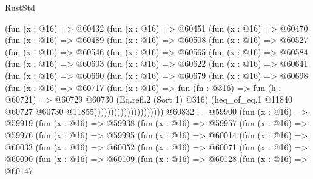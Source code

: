 \begin{lexlean}{RustStd}
\begin{coremodule}
          (fun (x : @16) =>
          @60432
            (fun (x : @16) =>
            @60451
              (fun (x : @16) =>
              @60470
                (fun (x : @16) =>
                @60489
                  (fun (x : @16) =>
                  @60508
                    (fun (x : @16) =>
                    @60527
                      (fun (x : @16) =>
                      @60546
                        (fun (x : @16) =>
                        @60565
                          (fun (x : @16) =>
                          @60584
                            (fun (x : @16) =>
                            @60603
                              (fun (x : @16) =>
                              @60622
                                (fun (x : @16) =>
                                @60641
                                  (fun (x : @16) =>
                                  @60660
                                    (fun (x : @16) =>
                                    @60679
                                      (fun (x : @16) =>
                                      @60698
                                        (fun (x : @16) =>
                                        @60717
                                          (fun (x : @16) =>
                                          fun (fn : @316) =>
                                          fun (h : @60721) =>
                                          @60729
                                            @60730
                                            (Eq.refl.{2} (Sort 1) @316)
                                            (heq_of_eq.{1}
                                              @11840
                                              @60727
                                              @60730
                                              @11855)))))))))))))))))))))
@60832 := @59900
    (fun (x : @16) =>
    @59919
      (fun (x : @16) =>
      @59938
        (fun (x : @16) =>
        @59957
          (fun (x : @16) =>
          @59976
            (fun (x : @16) =>
            @59995
              (fun (x : @16) =>
              @60014
                (fun (x : @16) =>
                @60033
                  (fun (x : @16) =>
                  @60052
                    (fun (x : @16) =>
                    @60071
                      (fun (x : @16) =>
                      @60090
                        (fun (x : @16) =>
                        @60109
                          (fun (x : @16) =>
                          @60128
                            (fun (x : @16) =>
                            @60147

\end{coremodule}
\end{lexlean}
